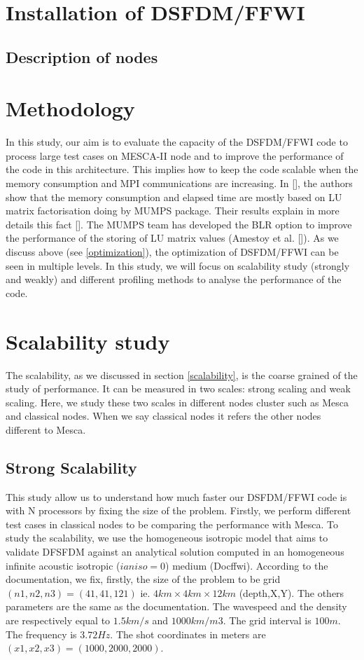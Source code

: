 \section{Installation of DSFDM/FFWI}
\subsection{Description of nodes}
\section{Methodology}
In this study, our aim is to evaluate the capacity of the DSFDM/FFWI code to process large test cases on MESCA-II node and to improve the performance of the code in this architecture. This implies how to keep the code scalable when the memory consumption and MPI communications are increasing. In [], the authors show that the memory consumption and elapsed time are mostly based on LU matrix factorisation doing by MUMPS package. Their results explain in more details this fact [].  The MUMPS team has developed the BLR option to improve the performance of the storing of LU matrix values (Amestoy et al. []). 
As we discuss above (see \ref{optimization}), the optimization of DSFDM/FFWI can be seen in multiple levels. In this study, we will focus on scalability study (strongly and weakly) and different profiling methods to analyse the performance of the code.  
\section{Scalability study}
The scalability, as we discussed in section \ref{scalability}, is the coarse grained of the study of performance. It can be measured in two scales: strong scaling and weak scaling. Here, we study these two scales in different  nodes cluster such as Mesca and classical nodes. When we say classical nodes it refers the other nodes different to Mesca.  
\subsection{Strong Scalability}
This study allow us to understand how much faster our DSFDM/FFWI code is with N processors by fixing the size of the problem. Firstly, we perform different test cases in classical nodes to be comparing the performance with Mesca. To study the scalability, we use the homogeneous isotropic model that aims to validate DFSFDM against an analytical solution computed in an homogeneous infinite acoustic isotropic ($ianiso=0$) medium (Docffwi). According to the documentation, we fix, firstly, the size of the problem to be grid $(n1,n2,n3)=(41,41,121)$ ie. $ 4km \times 4km \times 12km$ (depth,X,Y). The others parameters are the same as the documentation. The wavespeed and the density are respectively equal to $ 1.5km/s $ and $ 1000km/m3 $. The grid interval is $ 100m$. The frequency is $3.72Hz$. The shot coordinates in meters are $ (x1, x2, x3) = (1000, 2000, 2000)$.

